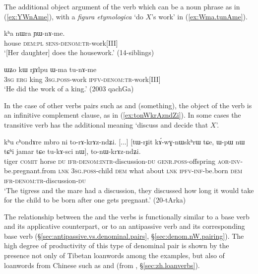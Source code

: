 The additional object argument of the  verb which can be a noun phrase as in (\ref{ex:YWnAme}), with a \textit{figura etymologica}  `do $X$'s work' in (\ref{ex:Wma.tunAme}). 
  
\begin{exe}
\ex \label{ex:YWnAme}
 \gll kʰa nɯra ɲɯ-nɤ-me. \\
 house \textsc{dem}:\textsc{pl} \textsc{sens}-\textsc{denom}:\textsc{tr}-work[III] \\
 \glt `[Her daughter] does the housework.' (14-siblings) 
  \end{exe} 
  
\begin{exe}
\ex \label{ex:Wma.tunAme}
 \gll  ɯʑo kɯ rɟɤlpu ɯ-ma tu-nɤ-me \\
 \textsc{3sg} \textsc{erg} king \textsc{3sg}.\textsc{poss}-work \textsc{ipfv}-\textsc{denom}:\textsc{tr}-work[III] \\
 \glt `He did the work of a king.' (2003 qachGa)
    \end{exe}

  In the case of other verbs pairs such as  and  (something), the object of the  verb is an infinitive complement clause, as in (\ref{ex:tonWkrAzndZi}). In some cases the transitive verb  has the additional meaning `discuss and decide that $X$'.

\begin{exe}
\ex \label{ex:tonWkrAzndZi}
 \gll  kʰu cʰondɤre mbro ni to-rɤ-krɤz-ndʑi. [...] [tɯ-rɟit kɤ́-wɣ-nɯskʰrɯ tɕe,
ɯ-pɯ nɯ tɕʰi jamar tɕe tu-kɤ-sci nɯ], to-nɯ-krɤz-ndʑi. \\
tiger \textsc{comit} horse \textsc{du} \textsc{ifr}-\textsc{denom}:\textsc{intr}-discussion-\textsc{du} { }
\textsc{genr}.\textsc{poss}-offspring \textsc{aor}-\textsc{inv}-be.pregnant.from \textsc{lnk} \textsc{3sg}.\textsc{poss}-child \textsc{dem} what about \textsc{lnk} \textsc{ipfv}-\textsc{inf}-be.born \textsc{dem} \textsc{ifr}-\textsc{denom}:\textsc{tr}-discussion-\textsc{du} \\
\glt `The tigress and the mare had a discussion, they discussed how long it would take for the child to be born after one gets pregnant.' (20-tArka) 	
 \end{exe}
 
 The relationship between the  and the  verbs is functionally similar to a base verb and its applicative counterpart, or to an antipassive verb and its corresponding base verb (§\ref{sec:antipassive.vs.denominal.pairs}, §\ref{sec:denom.nW.pairing}). The high degree of productivity of this type of denominal pair is shown by the presence not only of Tibetan loanwords among the examples, but also of loanwords from Chinese such as  and   (from , §\ref{sec:zh.loanverbs}).

